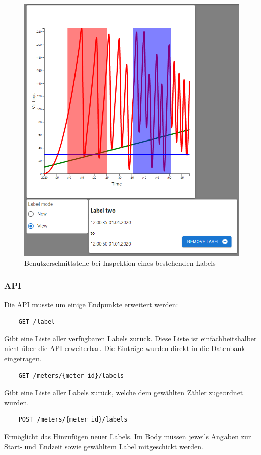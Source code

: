 \begin{figure}[H]
    \centering
    \includegraphics[width=1.0\textwidth]{gfx/viewLabel}
    \caption{Benutzerschnittstelle bei Inspektion eines bestehenden Labels}
    \label{fig:view_label}
\end{figure}

\subsubsection{API}
Die \ac{API} musste um einige Endpunkte erweitert werden:

\begin{verbatim}
    GET /label
\end{verbatim}
Gibt eine Liste aller verfügbaren Labels zurück.
Diese Liste ist einfachheitshalber nicht über die \ac{API} erweiterbar.
Die Einträge wurden direkt in die Datenbank eingetragen.
\begin{verbatim}
    GET /meters/{meter_id}/labels
\end{verbatim}
Gibt eine Liste aller Labels zurück, welche dem gewählten Zähler zugeordnet wurden.

\begin{verbatim}
    POST /meters/{meter_id}/labels
\end{verbatim}
Ermöglicht das Hinzufügen neuer Labels. Im Body müssen jeweils Angaben zur Start- und Endzeit
sowie gewähltem Label mitgeschickt werden.

